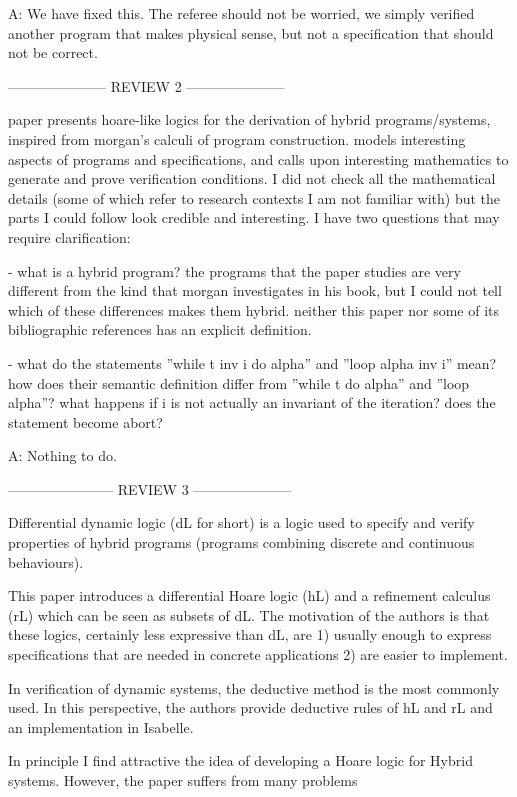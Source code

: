 \documentclass[envcountsame,envcountsect]{llncs}
\begin{document}
A: We have fixed this. The referee should not be worried, we simply verified another program that makes physical sense, but not a specification that should not be correct.



--------------------- REVIEW 2 ---------------------

paper presents hoare-like logics for the derivation of hybrid programs/systems, inspired from morgan's calculi of program construction. models interesting aspects of programs and specifications, and calls upon interesting mathematics to generate and prove verification conditions.
I did not check all the mathematical details (some of which refer to research contexts I am not familiar with) but the parts I could follow look credible and interesting.
I have two questions that may require clarification:

-  what is a hybrid program?  the programs that the paper studies are very different from the kind that morgan investigates in his book, but I could not tell which of these differences makes them hybrid.  neither this paper nor some of its bibliographic references has an explicit definition.


-  what do the statements ''while t inv i do alpha'' and ''loop alpha inv i'' mean?  how does their semantic definition differ from ''while t do alpha'' and ''loop alpha''?  what happens if i is not actually an invariant of the iteration?  does the statement become abort?

A: Nothing to do.



----------------------- REVIEW 3 ---------------------

Differential dynamic logic (dL for short) is a logic used to specify and verify properties of hybrid programs (programs combining discrete and continuous behaviours).

This paper introduces a differential Hoare logic (hL) and a refinement calculus (rL) which can be seen as subsets of dL. The motivation of the authors is that these logics, certainly less expressive than dL, are 1) usually enough to express specifications that are needed in concrete applications 2) are easier to implement.

In verification of dynamic systems, the deductive method is the most commonly used. In this perspective, the authors provide deductive rules of hL and rL and  an implementation in Isabelle.

In principle I find attractive the idea of developing a Hoare logic for Hybrid systems. However, the paper suffers  from many problems
\end{document}
